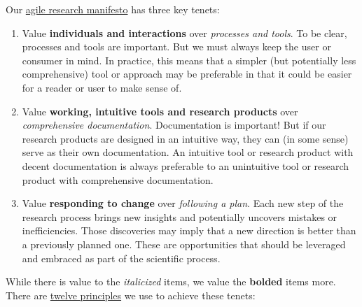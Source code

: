 \documentclass{tufte-book} %
\begin{document}
Our \href{http://agilemanifesto.org/}{agile research manifesto} has three key
tenets:
\begin{enumerate}
\item Value \textbf{individuals and interactions} over
  \textit{processes and tools}.  To be clear, processes and tools are
  important.  But we must always keep the user or consumer in mind.
  In practice, this means that a simpler (but potentially less
  comprehensive) tool or approach may be preferable in that it could
  be easier for a reader or user to make sense of.
\item Value \textbf{working, intuitive tools and research products}
  over \textit{comprehensive documentation}.  Documentation is
  important!  But if our research products are designed in an
  intuitive way, they can (in some sense) serve as their own
  documentation.  An intuitive tool or research product with decent
  documentation is always preferable to an unintuitive tool or
  research product with comprehensive documentation.
\item Value \textbf{responding to change} over \textit{following a
    plan}.  Each new step of the research process brings new insights
  and potentially uncovers mistakes or inefficiencies.  Those
  discoveries may imply that a new direction is better than a
  previously planned one.  These are opportunities that should be
  leveraged and embraced as part of the scientific process.
\end{enumerate}
While there is value to the \textit{italicized} items, we value the
\textbf{bolded} items more.  There are
\href{http://www.agilemanifesto.org/principles.html}{twelve
  principles} we use to achieve these tenets:
\end{document}
